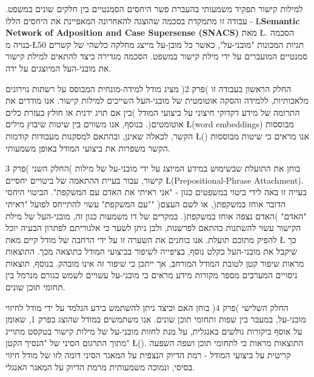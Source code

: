 \documentclass[
11pt, %
oneside, %
hebrew, english,
singlespacing, %
nohyperref, %
headsepline, %
]{MastersDoctoralThesis} %
\begin{document}

\begin{hebabstract}
למילות קישור תפקיד משמעותי בהעברת פשר היחסים הסמנטיים בין חלקים שונים במשפט. עבודה זו מתמקדת בסכמה שהוצגה להאחרונה המאפיינת את היחסים הללו -
\L{\textbf{Semantic Network of Adposition and Case Supersense (SNACS)}}
מאת \L{\cite{snacs}}.
הסכמה בנויה מ-\L{50} תגיות המכונות "מובני-על", כאשר כל מובן-על מייצג מחלקה כלשהי של קשרים סמנטיים המועברים על ידי מילת קישור במשפט. הסכמה מגדירה כיצד להתאים למילת קישור את מובני-העל המיוצגים על ידה. 

החלק הראשון בעבודה זו )פרק 2( מציג מודל למידה-מונחית המבוסס על רשתות נוירונים מלאכותיות, ללמידה והסקה אוטומטית של מובני-העל השייכים למילות קישור. 
אנו מודדים את התרומה של מידע דקדוקי חיצוני על ביצועי המודל )בין אם תויג ידנית או חולץ בעזרת כלים אוטומטים(. בנוסף, אנו משווים בין שיטות שיבוץ מילים \L{(word embeddings)}
מבוססות הקשר, לכאלה שאינן, ובהתאם למסקנות מעבודות קודמות \L{(\cite{nelson})}
אנו מראים כי שיטות מבוססות הקשר משפרות את ביצועי המודל באופן משמעותי. 


 החלק השני )פרק 3( בוחן את התועלת שבשימוש במידע המיוצג על ידי מובני-על של מילות קישור, עבור בעיית ההתאמה של ביטויים יחסיים \L{(Prepositional-Phrase Attachment)}.
 בעייה זו באה לידי ביטוי במשפטים כגון - "אני ראיתי את האדם עם המשקפת". הביטוי היחסי "עם המשקפת" עשוי להתייחס לפועל "ראיתי" )הדובר אוחז במשקפת(, או לשם העצם "האדם" )האדם נצפה אוחז במשקפת(. במקרים של דו משמעות כגון זה, מובני-העל של מילת הקישור עשוי להשתנות בהתאם לפרשנות, ולכן ניתן לשער כי אלגוריתם לפתרון הבעיה יוכל להפיק מתוכם תועלת. אנו בוחנים את השערה זו על ידי הרחבה של מודל קיים מאת \L{\cite{hpcd}}
 כך שיקבל את מובני-העל כקלט נוסף, בציפייה לשיפור בביצועי המודל כתוצאה מכך. 
התוצאות מראות שיפור קטן לטובת המודל המורחב, אך ייתכן כי שיפור זה אינו מובהק. בנוסף, תוצאות ניסויים המערבים מספר מקורות מידע מראים כי מובני-על עשויים לשמש כגורם מנרמל בין תחומי תוכן שונים.

החלק השלישי )פרק 4( בוחן האם וכיצד ניתן להשתמש בידע הנלמד על ידי מודל לחיזוי מובני-על, במעבר בין שפות ותחומי תוכן שונים. 
אנו משתמשים במודל שהוצג בפרק 1, שאומן על אוסף ביקורות גולשים באנגלית, על מנת לחזות מובני-על של מילות קישור בטקסט מתוייג מתוך התרגום הסיני של "הנסיך הקטן" \L{(\cite{chinesecorpus})}. התוצאות מראות כי לתחומי תוכן ושפה השפעה קריטית על ביצועי המודל - רמת הדיוק הנצפית על המאגר הסיני דומה לזו של מודל חיזוי בסיסי, ונמוכה משמעותית מרמת הדיוק על המאגר האנגלי.





\end{hebabstract}
\end{document}
